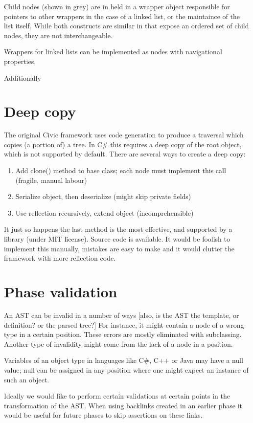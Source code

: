 \documentclass[final,a4paper,12pt]{article}
\begin{document}
Child nodes (shown in grey) are in held in a wrapper object responsible for pointers to other wrappers in the case of a linked list, or the maintaince of the list itself. While both constructs are similar in that expose an ordered set of child nodes, they are not interchangeable.

Wrappers for linked lists can be implemented as nodes with navigational properties, 

Additionally 

\section*{Deep copy}
The original Civic framework uses code generation to produce a traversal which copies (a portion of) a tree. In C\# this requires a deep copy of the root object, which is not supported by default. There are several ways to create a deep copy:

\begin{enumerate}
	\item Add clone() method to base class; each node must implement this call (fragile, manual labour)
	\item Serialize object, then deserialize (might skip private fields)
	\item Use reflection recursively, extend object (incomprehensible)
\end{enumerate}

It just so happens the last method is the most effective, and supported by a library (under MIT license). Source code is available. It would be foolish to implement this manually, mistakes are easy to make and it would clutter the framework with more reflection code.

\section*{Phase validation}
An AST can be invalid in a number of ways [also, is the AST the template, or definition? or the parsed tree?] For instance, it might contain a node of a wrong type in a certain position. These errors are mostly eliminated with subclassing. Another type of invalidity might come from the lack of a node in a position.

Variables of an object type in languages like C\#, C++ or Java may have a null value; null can be assigned in any position where one might expect an instance of such an object.

Ideally we would like to perform certain validations at certain points in the transformation of the AST. When using backlinks created in an earlier phase it would be useful for future phases to skip assertions on these links.
\end{document}

